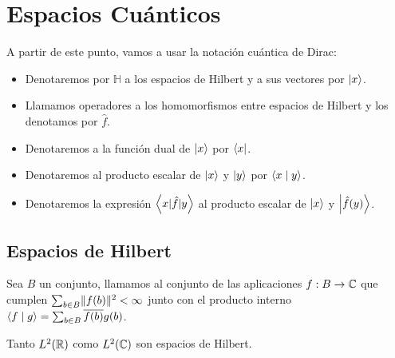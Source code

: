 \section{Espacios Cuánticos}
A partir de este punto, vamos a usar la notación cuántica de Dirac:
\begin{itemize}
  \item Denotaremos por $\mathbb{H}$ a los espacios de Hilbert y a sus vectores por $\left\lvert x\right\rangle$.
  \item Llamamos operadores a los homomorfismos entre espacios de Hilbert y los denotamos por $\hat{f}$.
  \item Denotaremos a la función dual de $\left\lvert x\right\rangle$ por $\left\langle x\right\rvert$.
  \item Denotaremos al producto escalar de $\left\lvert x\right\rangle$ y $\left\lvert y\right\rangle$ por $\left\langle x\mid y\right\rangle$.
  \item Denotaremos la expresión $\left\langle x|\hat{f}|y\right\rangle$ al producto escalar de ${\left\lvert x\right\rangle}$ y $\left\lvert\hat{f}(y)\right\rangle$.
\end{itemize}

\subsection{Espacios de Hilbert}

Sea $B$ un conjunto, llamamos  al conjunto de las aplicaciones $f:B\rightarrow\mathbb{C}$ que cumplen $\sum_{b\in B}\lVert f(b)\rVert^2 < \infty$ junto con el producto interno $\left\langle f\mid g\right\rangle=\sum_{b\in B}\overline{f(b)}g(b)$.

\begin{resultado}
  Tanto $L^2(\mathbb{R})$ como $L^2(\mathbb{C})$ son espacios de Hilbert.
\end{resultado}
